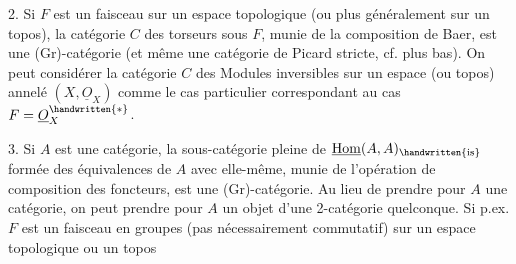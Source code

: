  2. Si $F$ est un faisceau sur un espace topologique (ou plus généralement sur un topos), la catégorie $C$ des torseurs sous $F$, munie de la composition de Baer, est une (Gr)-catégorie (et même une catégorie de Picard stricte, cf. plus bas). On peut considérer la catégorie $C$ des Modules inversibles sur un espace (ou topos)  annelé  $(X,\underline{O}_{X})$ comme le cas particulier correspondant au cas $F=\underline{O}_{X}^{\handwritten{*}}$.

 3. Si $A$ est une catégorie, la sous-catégorie pleine  de $\underline{\mathrm{Hom}}(A,A)_{\handwritten{\mathrm{is}}}$ formée des équivalences de $A$ avec elle-même, munie de l'opération de composition des foncteurs, est une (Gr)-catégorie. Au lieu de prendre pour $A$ une catégorie, on peut  prendre pour $A$ un objet d'une 2-catégorie quelconque. Si p.ex. $F$ est un faisceau en groupes (pas nécessairement commutatif) sur un espace topologique \handwritten{(}ou un topos\handwritten{)}\handwritten{,}
